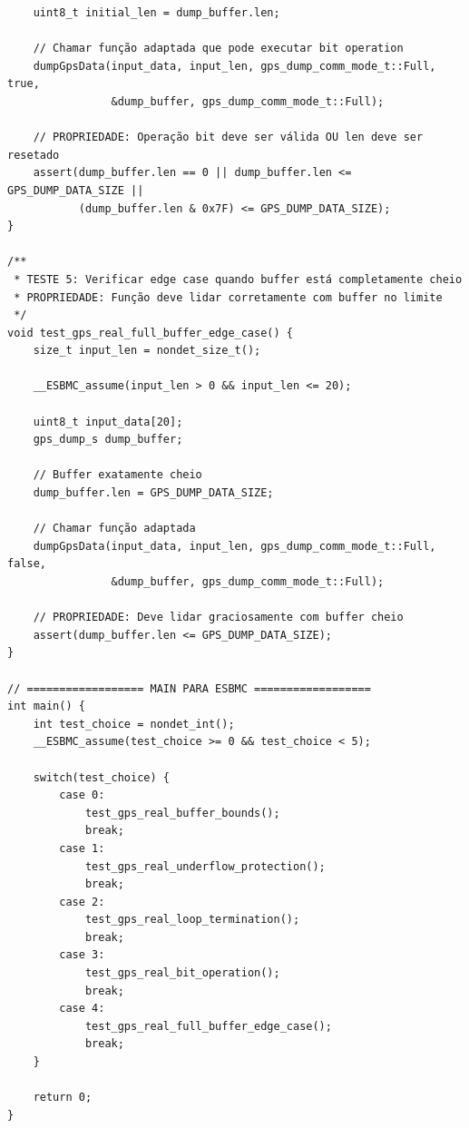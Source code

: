 \begin{lstlisting}
    uint8_t initial_len = dump_buffer.len;
    
    // Chamar função adaptada que pode executar bit operation
    dumpGpsData(input_data, input_len, gps_dump_comm_mode_t::Full, true, 
                &dump_buffer, gps_dump_comm_mode_t::Full);
    
    // PROPRIEDADE: Operação bit deve ser válida OU len deve ser resetado
    assert(dump_buffer.len == 0 || dump_buffer.len <= GPS_DUMP_DATA_SIZE || 
           (dump_buffer.len & 0x7F) <= GPS_DUMP_DATA_SIZE);
}

/**
 * TESTE 5: Verificar edge case quando buffer está completamente cheio
 * PROPRIEDADE: Função deve lidar corretamente com buffer no limite
 */
void test_gps_real_full_buffer_edge_case() {
    size_t input_len = nondet_size_t();
    
    __ESBMC_assume(input_len > 0 && input_len <= 20);
    
    uint8_t input_data[20];
    gps_dump_s dump_buffer;
    
    // Buffer exatamente cheio
    dump_buffer.len = GPS_DUMP_DATA_SIZE;
    
    // Chamar função adaptada
    dumpGpsData(input_data, input_len, gps_dump_comm_mode_t::Full, false, 
                &dump_buffer, gps_dump_comm_mode_t::Full);
    
    // PROPRIEDADE: Deve lidar graciosamente com buffer cheio
    assert(dump_buffer.len <= GPS_DUMP_DATA_SIZE);
}

// ================== MAIN PARA ESBMC ==================
int main() {
    int test_choice = nondet_int();
    __ESBMC_assume(test_choice >= 0 && test_choice < 5);
    
    switch(test_choice) {
        case 0:
            test_gps_real_buffer_bounds();
            break;
        case 1:
            test_gps_real_underflow_protection();
            break;
        case 2:
            test_gps_real_loop_termination();
            break;
        case 3:
            test_gps_real_bit_operation();
            break;
        case 4:
            test_gps_real_full_buffer_edge_case();
            break;
    }
    
    return 0;
}


\end{lstlisting}

